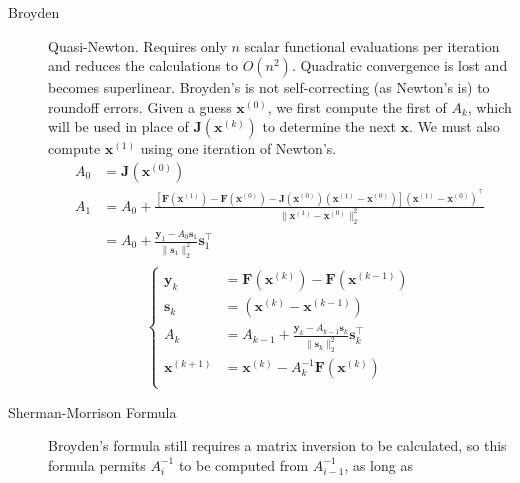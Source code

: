 \documentclass[8pt]{article}
\begin{document}
\begin{multicols}{2}
\begin{description}
    \item[Broyden] Quasi-Newton. Requires only $n$ scalar functional evaluations per iteration and
      reduces the calculations to $O(n^2)$. Quadratic convergence is lost and becomes
      superlinear. Broyden's is not self-correcting (as Newton's is) to roundoff errors. Given a
      guess $\mathbf{x}^{(0)}$, we first compute the first of $A_{k}$, which will be used in place
      of $\mathbf{J}(\mathbf{x}^{(k)})$ to determine the next $\mathbf{x}$. We must also compute
      $\mathbf{x}^{(1)}$ using one iteration of Newton's.
      \begin{equation*}
        \begin{aligned}
          A_0&=\mathbf{J}(\mathbf{x}^{(0)}) \\
          A_1&=A_0+\frac{[\mathbf{F}(\mathbf{x}^{(1)}) -
            \mathbf{F}(\mathbf{x}^{(0)}) -
            \mathbf{J}(\mathbf{x}^{(0)})(\mathbf{x}^{(1)}-\mathbf{x}^{(0)})](\mathbf{x}^{(1)}-\mathbf{x}^{(0)})^\top}{\|\mathbf{x}^{(1)}-\mathbf{x}^{(0)}\|^2_2} \\
          &=A_0+\frac{\mathbf{y}_1-A_{0}\mathbf{s}_1}{\|\mathbf{s}_1\|^2_2}\mathbf{s}_1^\top \\
        \end{aligned}
      \end{equation*}
      \begin{equation*}
        \left\{
        \begin{aligned}
          \mathbf{y}_k&=\mathbf{F}(\mathbf{x}^{(k)})-\mathbf{F}(\mathbf{x}^{(k-1)}) \\
          \mathbf{s}_k&=(\mathbf{x}^{(k)}-\mathbf{x}^{(k-1)}) \\
          A_k&=A_{k-1}+\frac{\mathbf{y}_k-A_{k-1}\mathbf{s}_k}{\|\mathbf{s}_k\|^2_2}\mathbf{s}_k^\top \\
          \mathbf{x}^{(k+1)}&=\mathbf{x}^{(k)}-A_k^{-1}\mathbf{F}(\mathbf{x}^{(k)}) \\
        \end{aligned}
        \right.
      \end{equation*}
    \item[Sherman-Morrison Formula] Broyden's formula still requires a matrix inversion to be
      calculated, so this formula permits $A_i^{-1}$ to be computed from $A_{i-1}^{-1}$, as long as

\end{description}
\end{multicols}
\end{document}
